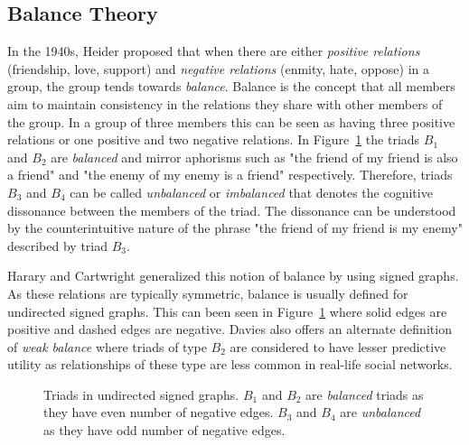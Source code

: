 \subsection{Balance Theory}
\label{sec:balance-theory}


In the 1940s, Heider \cite{heider1946attitudes} proposed  that when there are either \textit{positive relations} (friendship, love, support) and \textit{negative relations} (enmity, hate, oppose) in a group, the  group tends towards \textit{balance}. Balance is the concept that all members aim to maintain consistency in the relations they share with other members of the group. In a group of three members this can be seen as having three positive relations or one positive and two negative relations. In Figure~\ref{fig:undirected-triads} the triads $B_1$ and $B_2$ are \textit{balanced} and mirror aphorisms such as "the friend of my friend is also a friend" and "the enemy of my enemy is a friend" respectively. Therefore, triads $B_3$ and $B_4$ can be called \textit{unbalanced} or \textit{imbalanced} that denotes the cognitive dissonance between the members of the triad. The dissonance can be understood by the counterintuitive nature of the phrase "the friend of my friend is my enemy" described by triad $B_3$.

Harary and Cartwright \cite{cartwright1956structural} generalized this notion of balance by using signed graphs. As these relations are typically symmetric, balance is usually defined for undirected signed graphs. This can been seen in Figure~\ref{fig:undirected-triads} where solid edges are positive and dashed edges are negative. Davies \cite{davis1963weakBalance} also offers an alternate definition of \textit{weak balance} where triads of type $B_2$ are considered to have lesser predictive utility as relationships of these type are less common in real-life social networks.

\begin{figure}[!ht]     
    \centering
      
    \caption{Triads in undirected signed graphs. $B_1$ and $B_2$ are \textit{balanced} triads as they have even number of negative edges. $B_3$ and $B_4$ are \textit{unbalanced} as they have odd number of negative edges.}
    \label{fig:undirected-triads}
\end{figure}

